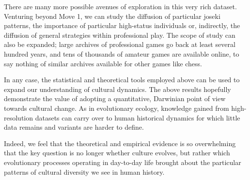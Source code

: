 \documentclass{article}
\begin{document}
There are many more possible avenues of exploration in this very rich dataset.  Venturing beyond Move 1, we can study the diffusion of particular joseki patterns, the importance of particular high-status individuals or, indirectly, the diffusion of general strategies within professional play.  The scope of study can also be expanded; large archives of professional games go back at least several hundred years, and tens of thousands of amateur games are available online, to say nothing of similar archives available for other games like chess.  

In any case, the statistical and theoretical tools employed above can be used to expand our understanding of cultural dynamics.  The above results hopefully demonstrate the value of adopting a quantitative, Darwinian point of view towards cultural change.  As in evolutionary ecology, knowledge gained from high-resolution datasets can carry over to human historical dynamics for which little data remains and variants are harder to define.  

Indeed, we feel that the theoretical and empirical evidence is so overwhelming that the key question is no longer whether culture evolves, but rather which evolutionary processes operating in day-to-day life brought about the particular patterns of cultural diversity we see in human history.  
\end{document}
